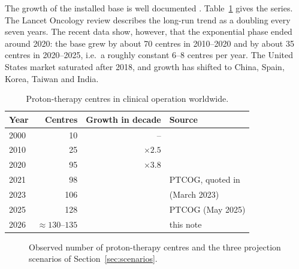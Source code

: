 \documentclass[11pt,a4paper]{article}
\begin{document}
The growth of the installed base is well documented \cite{lancet2023,
frontiers2026}. Table~\ref{tab:history} gives the series. The Lancet Oncology
review describes the long-run trend as a doubling every seven years. The
recent data show, however, that the exponential phase ended around 2020: the
base grew by about 70 centres in 2010--2020 and by about 35 centres in
2020--2025, i.e.\ a roughly constant 6--8 centres per year. The United States
market saturated after 2018, and growth has shifted to China, Spain, Korea,
Taiwan and India.

\begin{table}[h]
\centering
\caption{Proton-therapy centres in clinical operation worldwide.}
\label{tab:history}
\begin{tabular}{@{}lrrl@{}}
\toprule
Year & Centres & Growth in decade & Source \\
\midrule
2000 & 10  & --            & \cite{lancet2023} \\
2010 & 25  & $\times 2.5$  & \cite{lancet2023} \\
2020 & 95  & $\times 3.8$  & \cite{lancet2023} \\
2021 & 98  &               & PTCOG, quoted in \cite{frontiers2026} \\
2023 & 106 &               & \cite{lancet2023} (March 2023) \\
2025 & 128 &               & PTCOG \cite{ptcog_map} (May 2025) \\
2026 & $\approx 130$--$135$ &  & this note \\
\bottomrule
\end{tabular}
\end{table}

\begin{figure}[h]
\centering
{}
\caption{Observed number of proton-therapy centres and the three projection
scenarios of Section~\ref{sec:scenarios}.}
\label{fig:growth}
\end{figure}
\end{document}
